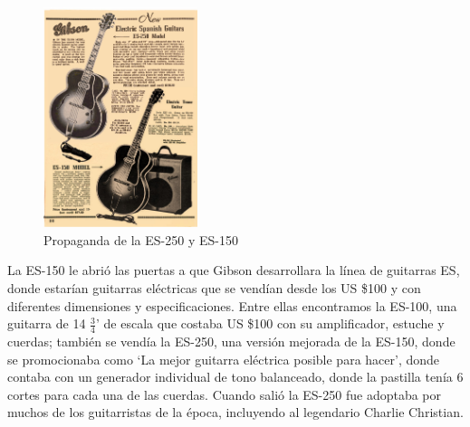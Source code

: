\documentclass{article}
\begin{document}
\begin{figure}
    \centering
    \includegraphics[width=0.4\textwidth]{images/promo.jpg}
    \vspace{-5pt}
    \caption{Propaganda de la ES-250 y ES-150}
\end{figure}

La ES-150 le abrió las puertas a que Gibson desarrollara la línea de guitarras ES, donde estarían guitarras eléctricas que se vendían desde los US \$100 y con diferentes dimensiones y especificaciones. Entre ellas encontramos la ES-100, una guitarra de 14 \(\frac{3}{4}\)' de escala que costaba US \$100 con su amplificador, estuche y cuerdas; también se vendía la ES-250, una versión mejorada de la ES-150, donde se promocionaba como ‘La mejor guitarra eléctrica posible para hacer’, donde contaba con un generador individual de tono balanceado, donde la pastilla tenía 6 cortes para cada una de las cuerdas. Cuando salió la ES-250 fue adoptaba por muchos de los guitarristas de la época, incluyendo al legendario Charlie Christian.\nocite{*}

\endgroup

\printbibliography[
title={Bibliografía}
]
\end{document}
